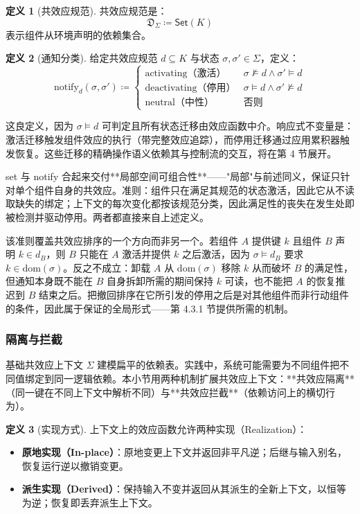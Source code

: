 \documentclass[11pt,a4paper]{article}
\theoremstyle{plain}
\theoremstyle{definition}
\newtheorem{definition}{定义}
\theoremstyle{remark}
\begin{document}
\begin{definition}[共效应规范]
共效应规范是：
\[
\mathfrak{D}_\Sigma \coloneqq \mathsf{Set}(K) \tag{25}
\]
表示组件从环境声明的依赖集合。
\end{definition}

\begin{definition}[通知分类]
给定共效应规范 $d \subseteq K$ 与状态 $\sigma, \sigma' \in \Sigma$，定义：
\[
\mathrm{notify}_d(\sigma, \sigma') \coloneqq \begin{cases}
\text{activating（激活）} & \sigma \not\models d \wedge \sigma' \models d \\
\text{deactivating（停用）} & \sigma \models d \wedge \sigma' \not\models d \\
\text{neutral（中性）} & \text{否则}
\end{cases} \tag{26}
\]
\end{definition}

这良定义，因为 $\sigma \models d$ 可判定且所有状态迁移由效应函数中介。响应式不变量是：激活迁移触发组件效应的执行（带完整效应追踪），而停用迁移通过应用累积器触发恢复。这些迁移的精确操作语义依赖其与控制流的交互，将在第 4 节展开。

set 与 notify 合起来交付**局部空间可组合性**——"局部"与前述同义，保证只针对单个组件自身的共效应。准则：组件只在满足其规范的状态激活，因此它从不读取缺失的绑定；上下文的每次变化都按该规范分类，因此满足性的丧失在发生处即被检测并驱动停用。两者都直接来自上述定义。

该准则覆盖共效应排序的一个方向而非另一个。若组件 $A$ 提供键 $k$ 且组件 $B$ 声明 $k \in d_B$，则 $B$ 只能在 $A$ 激活并提供 $k$ 之后激活，因为 $\sigma \models d_B$ 要求 $k \in \mathrm{dom}(\sigma)$。反之不成立：卸载 $A$ 从 $\mathrm{dom}(\sigma)$ 移除 $k$ 从而破坏 $B$ 的满足性，但通知本身既不能在 $B$ 自身拆卸所需的期间保持 $k$ 可读，也不能把 $A$ 的恢复推迟到 $B$ 结束之后。把撤回排序在它所引发的停用之后是对其他组件而非行动组件的条件，因此属于保证的全局形式——第 4.3.1 节提供所需的机制。

\subsubsection{隔离与拦截}

基础共效应上下文 $\Sigma$ 建模扁平的依赖表。实践中，系统可能需要为不同组件把不同值绑定到同一逻辑依赖。本小节用两种机制扩展共效应上下文：**共效应隔离**（同一键在不同上下文中解析不同）与**共效应拦截**（依赖访问上的横切行为）。

\begin{definition}[实现方式]
上下文上的效应函数允许两种实现（Realization）：
\begin{itemize}
\item \textbf{原地实现（In-place）}：原地变更上下文并返回非平凡逆；后继与输入别名，恢复运行逆以撤销变更。
\item \textbf{派生实现（Derived）}：保持输入不变并返回从其派生的全新上下文，以恒等为逆；恢复即丢弃派生上下文。
\end{itemize}
\end{definition}
\end{document}
